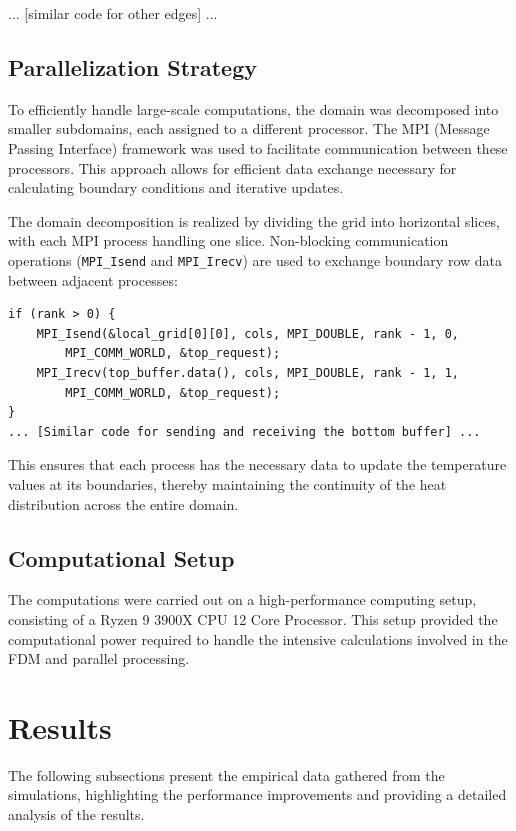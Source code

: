 \documentclass[11pt]{article}
\begin{document}
        ... [similar code for other edges] ...
        
        \subsection{Parallelization Strategy}
        
        To efficiently handle large-scale computations, the domain was decomposed into smaller subdomains, each assigned to a different processor. The MPI (Message Passing Interface) framework was used to facilitate communication between these processors. This approach allows for efficient data exchange necessary for calculating boundary conditions and iterative updates.
        
        The domain decomposition is realized by dividing the grid into horizontal slices, with each MPI process handling one slice. Non-blocking communication operations (\texttt{MPI\_Isend} and \texttt{MPI\_Irecv}) are used to exchange boundary row data between adjacent processes:
        
        \begin{verbatim}
if (rank > 0) {
    MPI_Isend(&local_grid[0][0], cols, MPI_DOUBLE, rank - 1, 0, 
        MPI_COMM_WORLD, &top_request);
    MPI_Irecv(top_buffer.data(), cols, MPI_DOUBLE, rank - 1, 1, 
        MPI_COMM_WORLD, &top_request);
}
... [Similar code for sending and receiving the bottom buffer] ...
        \end{verbatim}
        
        
        This ensures that each process has the necessary data to update the temperature values at its boundaries, thereby maintaining the continuity of the heat distribution across the entire domain.
        
        \subsection{Computational Setup}
        
        The computations were carried out on a high-performance computing setup, consisting of a Ryzen 9 3900X CPU 12 Core Processor. This setup provided the computational power required to handle the intensive calculations involved in the FDM and parallel processing.
        

    \section{Results}
        The following subsections present the empirical data gathered from the simulations, highlighting the performance improvements and providing a detailed analysis of the results.
\end{document}
